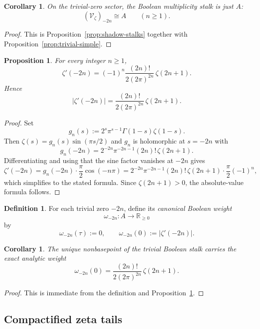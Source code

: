 \documentclass[11pt,a4paper]{article}
\numberwithin{equation}{section}
\newtheorem{proposition}[theorem]{Proposition}
\newtheorem{corollary}[theorem]{Corollary}
\theoremstyle{definition}
\newtheorem{definition}[theorem]{Definition}
\theoremstyle{remark}
\newcommand{\RR}{\mathbb R}
\newcommand{\cV}{\mathcal V}
\newcommand{\taup}{\tau}
\begin{document}
\begin{corollary}\label{cor:trivial-stalk}
On the trivial-zero sector, the Boolean multiplicity stalk is just $A$:
\[
(\cV_\zeta)_{-2n}\cong A\qquad(n\ge1).
\]
\end{corollary}

\begin{proof}
This is Proposition~\ref{prop:shadow-stalks} together with Proposition~\ref{prop:trivial-simple}.
\end{proof}

\begin{proposition}\label{prop:trivial-derivative}
For every integer $n\ge1$,
\[
\zeta'(-2n)=(-1)^n\frac{(2n)!}{2(2\pi)^{2n}}\,\zeta(2n+1).
\]
Hence
\[
|\zeta'(-2n)|=\frac{(2n)!}{2(2\pi)^{2n}}\,\zeta(2n+1).
\]
\end{proposition}

\begin{proof}
Set
\[
g_n(s):=2^s\pi^{s-1}\Gamma(1-s)\zeta(1-s).
\]
Then $\zeta(s)=g_n(s)\sin(\pi s/2)$ and $g_n$ is holomorphic at $s=-2n$ with
\[
g_n(-2n)=2^{-2n}\pi^{-2n-1}(2n)!\,\zeta(2n+1).
\]
Differentiating and using that the sine factor vanishes at $-2n$ gives
\[
\zeta'(-2n)=g_n(-2n)\cdot \frac\pi2\cos(-n\pi)
=2^{-2n}\pi^{-2n-1}(2n)!\,\zeta(2n+1)\cdot\frac\pi2(-1)^n,
\]
which simplifies to the stated formula.  Since $\zeta(2n+1)>0$, the absolute-value formula follows.
\end{proof}

\begin{definition}
For each trivial zero $-2n$, define its \emph{canonical Boolean weight}
\[
\omega_{-2n}:A\to\RR_{\ge0}
\]
by
\[
\omega_{-2n}(\taup):=0,
\qquad
\omega_{-2n}(0):=|\zeta'(-2n)|.
\]
\end{definition}

\begin{corollary}\label{cor:trivial-weight}
The unique nonbasepoint of the trivial Boolean stalk carries the exact analytic weight
\[
\omega_{-2n}(0)=\frac{(2n)!}{2(2\pi)^{2n}}\,\zeta(2n+1).
\]
\end{corollary}

\begin{proof}
This is immediate from the definition and Proposition~\ref{prop:trivial-derivative}.
\end{proof}

\subsection{Compactified zeta tails}
\end{document}
